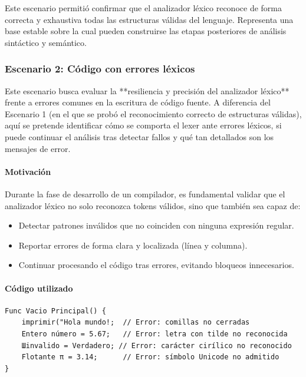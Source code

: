 \documentclass{article}
\begin{document}
Este escenario permitió confirmar que el analizador léxico reconoce de forma correcta y exhaustiva todas las estructuras válidas del lenguaje. Representa una base estable sobre la cual pueden construirse las etapas posteriores de análisis sintáctico y semántico.


\subsubsection{Escenario 2: Código con errores léxicos}

Este escenario busca evaluar la **resiliencia y precisión del analizador léxico** frente a errores comunes en la escritura de código fuente. A diferencia del Escenario 1 (en el que se probó el reconocimiento correcto de estructuras válidas), aquí se pretende identificar cómo se comporta el lexer ante errores léxicos, si puede continuar el análisis tras detectar fallos y qué tan detallados son los mensajes de error.

\paragraph{Motivación}

Durante la fase de desarrollo de un compilador, es fundamental validar que el analizador léxico no solo reconozca tokens válidos, sino que también sea capaz de:

\begin{itemize}
  \item Detectar patrones inválidos que no coinciden con ninguna expresión regular.
  \item Reportar errores de forma clara y localizada (línea y columna).
  \item Continuar procesando el código tras errores, evitando bloqueos innecesarios.
\end{itemize}

\paragraph{Código utilizado}
\begin{lstlisting}[style=mypython, caption={Fragmento con errores léxicos intencionados}]
Func Vacio Principal() {
    imprimir("Hola mundo!;  // Error: comillas no cerradas
    Entero número = 5.67;   // Error: letra con tilde no reconocida
    Шinvalido = Verdadero; // Error: carácter cirílico no reconocido
    Flotante π = 3.14;      // Error: símbolo Unicode no admitido
}
\end{lstlisting}
\end{document}
